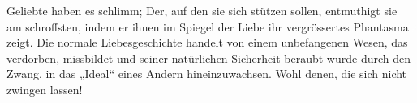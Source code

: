 Geliebte haben es schlimm; Der, auf den sie sich stützen sollen, entmuthigt sie am schroffsten, indem er ihnen im Spiegel der Liebe ihr vergrössertes Phantasma zeigt. Die normale Liebesgeschichte handelt von einem unbefangenen Wesen, das verdorben, missbildet und seiner natürlichen Sicherheit beraubt wurde durch den Zwang, in das „Ideal“ eines Andern hineinzuwachsen. Wohl denen, die sich nicht zwingen lassen!
\par

